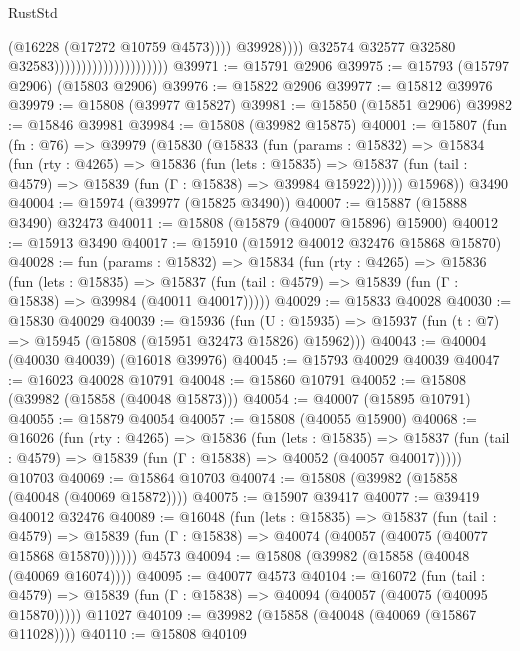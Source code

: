 \begin{lexlean}{RustStd}
\begin{coremodule}
                                                          (@16228 (@17272 @10759 @4573))))
                                                      @39928))))
                                              @32574
                                              @32577
                                              @32580
                                              @32583)))))))))))))))))))))
@39971 := @15791 @2906
@39975 := @15793 (@15797 @2906) (@15803 @2906)
@39976 := @15822 @2906
@39977 := @15812 @39976
@39979 := @15808 (@39977 @15827)
@39981 := @15850 (@15851 @2906)
@39982 := @15846 @39981
@39984 := @15808 (@39982 @15875)
@40001 := @15807
    (fun (fn : @76) =>
    @39979
      (@15830
        (@15833
          (fun (params : @15832) =>
          @15834
            (fun (rty : @4265) =>
            @15836
              (fun (lets : @15835) =>
              @15837 (fun (tail : @4579) => @15839 (fun (Γ : @15838) => @39984 @15922))))))
        @15968))
    @3490
@40004 := @15974 (@39977 (@15825 @3490))
@40007 := @15887 (@15888 @3490) @32473
@40011 := @15808 (@15879 (@40007 @15896) @15900)
@40012 := @15913 @3490
@40017 := @15910 (@15912 @40012 @32476 @15868 @15870)
@40028 := fun (params : @15832) =>
  @15834
    (fun (rty : @4265) =>
    @15836
      (fun (lets : @15835) =>
      @15837 (fun (tail : @4579) => @15839 (fun (Γ : @15838) => @39984 (@40011 @40017)))))
@40029 := @15833 @40028
@40030 := @15830 @40029
@40039 := @15936
    (fun (U : @15935) => @15937 (fun (t : @7) => @15945 (@15808 (@15951 @32473 @15826) @15962)))
@40043 := @40004 (@40030 @40039) (@16018 @39976)
@40045 := @15793 @40029 @40039
@40047 := @16023 @40028 @10791
@40048 := @15860 @10791
@40052 := @15808 (@39982 (@15858 (@40048 @15873)))
@40054 := @40007 (@15895 @10791)
@40055 := @15879 @40054
@40057 := @15808 (@40055 @15900)
@40068 := @16026
    (fun (rty : @4265) =>
    @15836
      (fun (lets : @15835) =>
      @15837 (fun (tail : @4579) => @15839 (fun (Γ : @15838) => @40052 (@40057 @40017)))))
    @10703
@40069 := @15864 @10703
@40074 := @15808 (@39982 (@15858 (@40048 (@40069 @15872))))
@40075 := @15907 @39417
@40077 := @39419 @40012 @32476
@40089 := @16048
    (fun (lets : @15835) =>
    @15837
      (fun (tail : @4579) =>
      @15839 (fun (Γ : @15838) => @40074 (@40057 (@40075 (@40077 @15868 @15870))))))
    @4573
@40094 := @15808 (@39982 (@15858 (@40048 (@40069 @16074))))
@40095 := @40077 @4573
@40104 := @16072
    (fun (tail : @4579) => @15839 (fun (Γ : @15838) => @40094 (@40057 (@40075 (@40095 @15870)))))
    @11027
@40109 := @39982 (@15858 (@40048 (@40069 (@15867 @11028))))
@40110 := @15808 @40109

\end{coremodule}
\end{lexlean}
